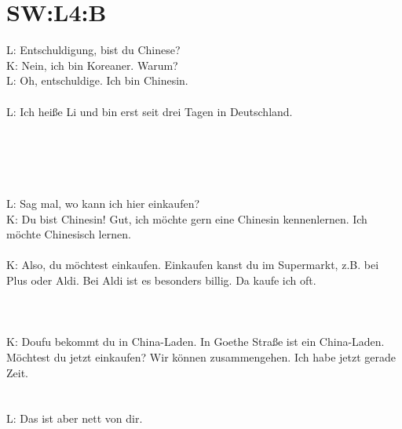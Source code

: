 \section{SW:L4:B}
\noindent
L: Entschuldigung, bist du Chinese? \\
K: Nein, ich bin Koreaner. Warum? \\
L: Oh, entschuldige. Ich bin Chinesin.  \\
\\
L: Ich heiße Li und bin erst seit drei Tagen in Deutschland.  \\
\\
\\
\\
\\
\\
L: Sag mal, wo kann ich hier einkaufen? \\
K: Du bist Chinesin! Gut, ich möchte gern eine Chinesin kennenlernen.  Ich möchte Chinesisch lernen. \\
\\
K: Also, du möchtest einkaufen. Einkaufen kanst du im Supermarkt, z.B. bei Plus oder Aldi. Bei Aldi ist es besonders billig.  Da kaufe ich oft. \\
\\
\\
\\
K: Doufu bekommt du in China-Laden.  In Goethe Straße ist ein China-Laden. Möchtest du jetzt einkaufen? Wir können zusammengehen. Ich habe jetzt gerade Zeit.  \\
\\
\\
L: Das ist aber nett von dir.

